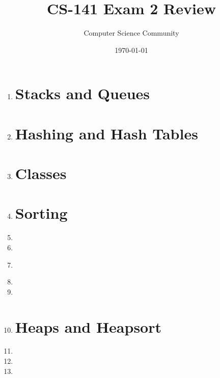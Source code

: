 \documentclass[11pt]{article}
\title{CS-141 Exam 2 Review}
\author{Computer Science Community}
\date{\today}
\begin{document}
\header

\begin{enumerate}

\section*{Linked Lists}
    \item 

\pagebreak
\section*{Stacks and Queues}
	\item 

\pagebreak
\section*{Hashing and Hash Tables}
	\item 

\section*{Classes}
	\item 

\newpage
\section*{Sorting}
	\item 

	\item 

	\item \label{qsort-worst-case} 

	\item 

	\item 
      
\newpage
	\item 

\section*{Heaps and Heapsort}
	\item 

	\item 

	\item 

\end{enumerate}
\end{document}
